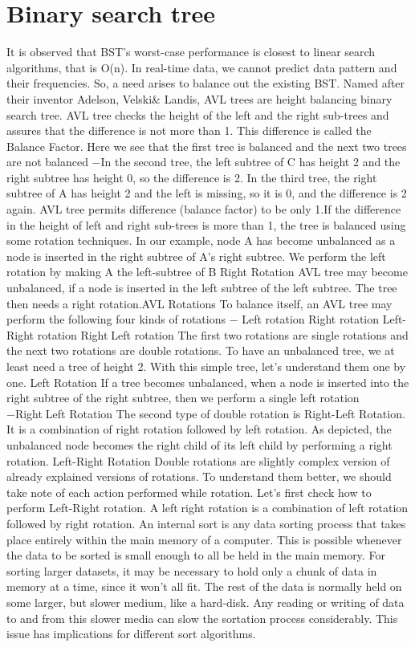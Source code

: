 \documentclass{article}
\begin{document}
\section{Binary search tree}
It is observed that BST's worst-case performance is 
closest to linear search algorithms, that is Ο(n). In 
real-time data, we cannot predict data pattern and 
their frequencies. So, a need arises to balance out the 
existing BST. 
Named after their inventor Adelson, Velski& Landis, 
AVL trees are height balancing binary search tree. 
AVL tree checks the height of the left and the right 
sub-trees and assures that the difference is not more 
than 1. This difference is called the Balance Factor. 
Here we see that the first tree is balanced and the next 
two trees are not balanced −In the second tree, the left 
subtree of C has height 2 and the right subtree has 
height 0, so the difference is 2. In the third tree, the 
right subtree of A has height 2 and the left is missing, 
so it is 0, and the difference is 2 again. AVL tree 
permits difference (balance factor) to be only 1.If the 
difference in the height of left and right sub-trees is 
more than 1, the tree is balanced using some rotation 
techniques. In our example, node A has become 
unbalanced as a node is inserted in the right subtree of 
A's right subtree. We perform the left rotation by 
making A the left-subtree of B Right Rotation AVL tree may become unbalanced, if 
a node is inserted in the left subtree of the left subtree. 
The tree then needs a right rotation.AVL Rotations To 
balance itself, an AVL tree may perform the 
following four kinds of rotations − 
Left rotation Right rotation Left-Right rotation RightLeft rotation The first two rotations are single 
rotations and the next two rotations are double 
rotations. To have an unbalanced tree, we at least 
need a tree of height 2. With this simple tree, let's 
understand them one by one. 
Left Rotation If a tree becomes unbalanced, when a 
node is inserted into the right subtree of the right 
subtree, then we perform a single left rotation −RightLeft Rotation The second type of double rotation is 
Right-Left Rotation. It is a combination of right 
rotation followed by left rotation. As depicted, the 
unbalanced node becomes the right child of its left 
child by performing a right rotation. 
Left-Right Rotation Double rotations are slightly 
complex version of already explained versions of 
rotations. To understand them better, we should take 
note of each action performed while rotation. Let's 
first check how to perform Left-Right rotation. A leftright rotation is a combination of left rotation 
followed by right rotation.
An internal sort is any data sorting process that takes 
place entirely within the main memory of a computer. 
This is possible whenever the data to be sorted is 
small enough to all be held in the main memory. For 
sorting larger datasets, it may be necessary to hold 
only a chunk of data in memory at a time, since it 
won’t all fit. The rest of the data is normally held on 
some larger, but slower medium, like a hard-disk. 
Any reading or writing of data to and from this slower 
media can slow the sortation process considerably. 
This issue has implications for different sort 
algorithms.
\end{document}
